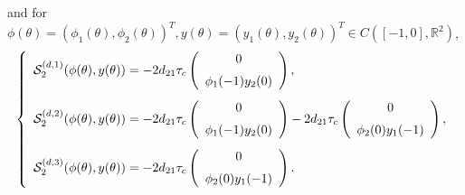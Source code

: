 \documentclass[11pt]{article}
\theoremstyle{definition}
\theoremstyle{remark}
\numberwithin{equation}{section}
\begin{document}
and for $\phi(\theta)=\left(\phi_1(\theta), \phi_2(\theta)\right )^T, y(\theta)=\left(y_1(\theta), y_2(\theta)\right )^T\in C\left([-1, 0], \mathbb{R}^2\right)$,
\begin{equation}
\label{SDJ}
\left\{
\begin{array}{l}
\mathcal{S}_2^{(d,1)}(\phi (\theta), y(\theta))=
-2d_{21}\tau_c\left(\begin{array}{c}
0\vspace{0.2cm}\\
\phi_1(-1)y_2(0)
\end{array}\right),
\vspace{0.3cm}\\
\mathcal{S}_2^{(d,2)}(\phi (\theta), y(\theta) )
=
-2d_{21}\tau_c\left(\begin{array}{c}
0\vspace{0.2cm}\\
\phi_1(-1)y_2(0)
\end{array}\right)-2d_{21}\tau_c\left(\begin{array}{c}
0\vspace{0.2cm}\\
\phi_2(0)y_1(-1)
\end{array}\right),

\vspace{0.3cm}\\
\mathcal{S}_2^{(d,3)}(\phi(\theta), y(\theta) )=
-2d_{21}\tau_c\left(\begin{array}{c}
0\vspace{0.2cm}\\
\phi_2(0)y_1(-1)
\end{array}\right).
\end{array}
\right.
\end{equation}
\end{document}
